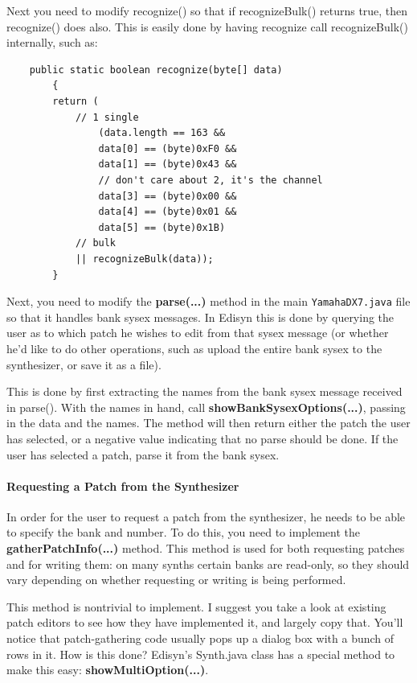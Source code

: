 \documentclass{article}
\begin{document}
Next you need to modify recognize() so that if recognizeBulk() returns true, then recognize() does also.  This is easily done by having recognize call recognizeBulk() internally, such as:

\begin{verbatim}
    public static boolean recognize(byte[] data)
        {
        return (
            // 1 single
                (data.length == 163 &&
                data[0] == (byte)0xF0 &&
                data[1] == (byte)0x43 &&
                // don't care about 2, it's the channel
                data[3] == (byte)0x00 &&
                data[4] == (byte)0x01 &&
                data[5] == (byte)0x1B) 
            // bulk
            || recognizeBulk(data));
        }
\end{verbatim}

Next, you need to modify the {\bf parse(...)} method in the main {\tt YamahaDX7.java} file so that it handles bank sysex messages.  In Edisyn this is done by querying the user as to which patch he wishes to edit from that sysex message (or whether he'd like to do other operations, such as upload the entire bank sysex to the synthesizer, or save it as a file).  

This is done by first extracting the names from the bank sysex message received in parse().  With the names in hand, call {\bf showBankSysexOptions(...)}, passing in the data and the names.  The method will then return either the patch the user has selected, or a negative value indicating that no parse should be done.  If the user has selected a patch, parse it from the bank sysex.

\paragraph{Requesting a Patch from the Synthesizer}

In order for the user to request a patch from the synthesizer, he needs to be able to specify the bank and number.  To do this, you need to implement the {\bf gatherPatchInfo(...)} method.   This method is used for both requesting patches and for writing them: on many synths certain banks are read-only, so they should vary depending on whether requesting or writing is being performed.

This method is nontrivial to implement. I suggest you take a look at existing patch editors to see how they have implemented it, and largely copy that.  You'll notice that patch-gathering code usually pops up a dialog box with a bunch of rows in it.  How is this done?  Edisyn's Synth.java class has a special method to make this easy: {\bf showMultiOption(...)}. 
\end{document}
